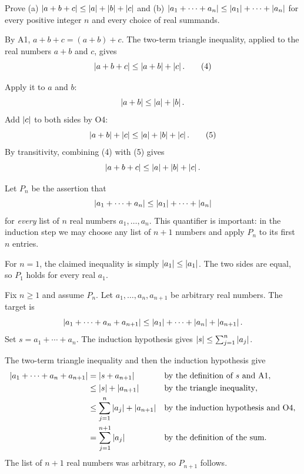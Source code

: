
\goal Prove (a) $\left|a+b+c\right|\le\left|a\right|+\left|b\right|+\left|c\right|$ and
(b) $\left|a_1+\cdots+a_n\right|\le\left|a_1\right|+\cdots+\left|a_n\right|$
for every positive integer $n$ and every choice of real summands.

By A1, $a+b+c=(a+b)+c$. The two-term triangle inequality, applied to
the real numbers $a+b$ and $c$, gives
\[
 \left|a+b+c\right|\le\left|a+b\right|+\left|c\right|. \tag{4}
\]

Apply it to $a$ and $b$:
\[
 \left|a+b\right|\le\left|a\right|+\left|b\right|.
\]
Add $\left|c\right|$ to both sides by O4:
\[
 \left|a+b\right|+\left|c\right|\le\left|a\right|+\left|b\right|+\left|c\right|. \tag{5}
\]
By transitivity, combining (4) with (5) gives
\[
 \left|a+b+c\right|\le\left|a\right|+\left|b\right|+\left|c\right|.
\]


Let $P_n$ be the assertion that
\[
 \left|a_1+\cdots+a_n\right|\le\left|a_1\right|+\cdots+\left|a_n\right|
\]
for \emph{every} list of $n$ real numbers $a_1,\ldots,a_n$.
This quantifier is important: in the induction step we may choose any
list of $n+1$ numbers and apply $P_n$ to its first $n$ entries.

For $n=1$, the claimed inequality is simply $\left|a_1\right|\le\left|a_1\right|$.
The two sides are equal, so $P_1$ holds for every real $a_1$.

Fix $n\ge1$ and assume $P_n$. Let
$a_1,\ldots,a_n,a_{n+1}$ be arbitrary real numbers. The target is
\[
 \left|a_1+\cdots+a_n+a_{n+1}\right|
   \le\left|a_1\right|+\cdots+\left|a_n\right|+\left|a_{n+1}\right|.
\]
Set $s=a_1+\cdots+a_n$. The induction hypothesis gives
$\left|s\right|\le\sum_{j=1}^{n}\left|a_j\right|$.

The two-term triangle inequality and then the induction hypothesis give
\begin{align*}
 \left|a_1+\cdots+a_n+a_{n+1}\right|
   &=\left|s+a_{n+1}\right| &&\text{by the definition of $s$ and A1},\\
   &\le\left|s\right|+\left|a_{n+1}\right| &&\text{by the triangle inequality},\\
   &\le\sum_{j=1}^{n}\left|a_j\right|+\left|a_{n+1}\right|
       &&\text{by the induction hypothesis and O4},\\
   &=\sum_{j=1}^{n+1}\left|a_j\right| &&\text{by the definition of the sum}.
\end{align*}
The list of $n+1$ real numbers was arbitrary, so $P_{n+1}$ follows.

